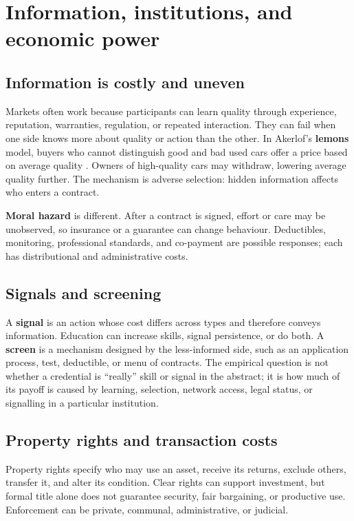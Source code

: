 \documentclass[11pt,oneside,openany]{book}
\newcommand{\term}[1]{\textbf{#1}\index{#1}}
\begin{document}
\chapter{Information, institutions, and economic power}
\label{ch:institutions}

\section{Information is costly and uneven}

Markets often work because participants can learn quality through experience, reputation, warranties, regulation, or repeated interaction. They can fail when one side knows more about quality or action than the other. In Akerlof's \term{lemons} model, buyers who cannot distinguish good and bad used cars offer a price based on average quality \cite{akerlof1970}. Owners of high-quality cars may withdraw, lowering average quality further. The mechanism is adverse selection: hidden information affects who enters a contract.

\term{Moral hazard} is different. After a contract is signed, effort or care may be unobserved, so insurance or a guarantee can change behaviour. Deductibles, monitoring, professional standards, and co-payment are possible responses; each has distributional and administrative costs.

\section{Signals and screening}

A \term{signal} is an action whose cost differs across types and therefore conveys information. Education can increase skills, signal persistence, or do both. A \term{screen} is a mechanism designed by the less-informed side, such as an application process, test, deductible, or menu of contracts. The empirical question is not whether a credential is ``really'' skill or signal in the abstract; it is how much of its payoff is caused by learning, selection, network access, legal status, or signalling in a particular institution.

\section{Property rights and transaction costs}

Property rights specify who may use an asset, receive its returns, exclude others, transfer it, and alter its condition. Clear rights can support investment, but formal title alone does not guarantee security, fair bargaining, or productive use. Enforcement can be private, communal, administrative, or judicial.
\end{document}
